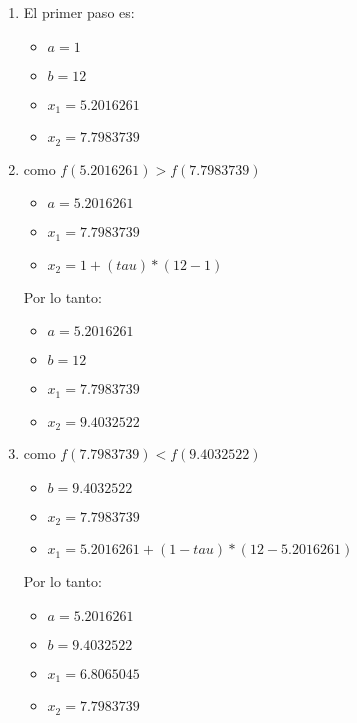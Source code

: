 \documentclass[12pt, fleqn]{article}                            %
\theoremstyle{break}                                            %
\begin{document}
        \begin{enumerate}
            \item El primer paso es:
                \begin{itemize}
                    \item $a = 1$
                    \item $b = 12$
                    \item $x_1 = 5.2016261$
                    \item $x_2 = 7.7983739$
                \end{itemize}
            
            \item como $f(5.2016261) > f(7.7983739)$
                \begin{itemize}
                    \item $a = 5.2016261$
                    \item $x_1 = 7.7983739$
                    \item $x_2 = 1+ (tau) * (12 - 1)$
                \end{itemize}

                Por lo tanto:
                \begin{itemize}
                    \item $a = 5.2016261$
                    \item $b = 12$
                    \item $x_1 = 7.7983739$
                    \item $x_2 = 9.4032522$
                \end{itemize}

            \item como $f(7.7983739) < f(9.4032522)$

                \begin{itemize}
                    \item $b = 9.4032522$
                    \item $x_2 = 7.7983739$
                    \item $x_1 = 5.2016261+ (1 -tau) * (12 - 5.2016261)$
                \end{itemize}

                Por lo tanto:
                \begin{itemize}
                    \item $a = 5.2016261$
                    \item $b = 9.4032522$
                    \item $x_1 = 6.8065045$
                    \item $x_2 = 7.7983739$
                \end{itemize}


\end{enumerate}
\end{document}
